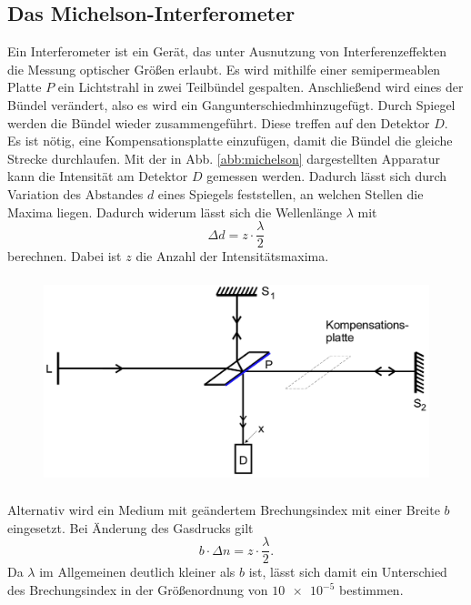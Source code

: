 \subsection{Das Michelson-Interferometer}
Ein Interferometer ist ein Gerät, das unter Ausnutzung von Interferenzeffekten die 
Messung optischer Größen erlaubt. 
Es wird mithilfe einer semipermeablen Platte $P$ ein Lichtstrahl in zwei Teilbündel 
gespalten. Anschließend wird eines der Bündel verändert, also es wird ein Gangunterschiedmhinzugefügt. Durch Spiegel werden die Bündel wieder zusammengeführt. Diese treffen auf den Detektor $D$.
Es ist nötig, eine Kompensationsplatte einzufügen, damit die Bündel die gleiche Strecke
durchlaufen.
Mit der in Abb. \ref{abb:michelson} dargestellten Apparatur kann die Intensität am 
Detektor $D$ gemessen werden. Dadurch lässt sich durch Variation des Abstandes $d$ eines Spiegels feststellen, an welchen Stellen die Maxima liegen. Dadurch widerum lässt sich die 
Wellenlänge $\lambda$ mit 
\begin{equation}
    \Delta d = z \cdot \frac{\lambda}{2}
    \label{eqn:lambda}
\end{equation}
berechnen. Dabei ist $z$ die Anzahl der Intensitätsmaxima.

\begin{figure}
    \centering
    \includegraphics[width=12cm, height=6cm]{build/michelson.png}
    \caption{}
    \label{fig:michelson}
\end{figure}

\noindent Alternativ wird ein Medium mit geändertem Brechungsindex mit einer Breite $b$ eingesetzt. 
Bei Änderung des Gasdrucks gilt
\begin{equation}
    b \cdot \Delta n = z \cdot \frac{\lambda}{2}.
    \label{eqn:deltan}
\end{equation}
Da $\lambda$ im Allgemeinen deutlich kleiner als $b$ ist, lässt sich damit ein 
Unterschied des Brechungsindex in der Größenordnung von $\num{10e-5}$ bestimmen.

